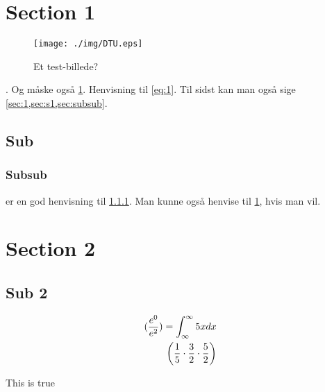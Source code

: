 
\newcommand{\lang}{danish}
\newcommand{\titl}{Test Document 1}
\newcommand{\auth}{Daniel Brasholt s214676}
\newcommand{\courseno}{01010}
\newcommand{\course}{Testkursus}
\newcommand{\dato}{Maj 2023}
\newcommand{\secheader}{Opgave}
\newcommand{\subsecheader}{Opg.}
\newcommand{\sourcefile}{}


\section{Section 1}
\label{sec:1}

\begin{figure}[H]
	\centering
	\texttt{[image: ./img/DTU.eps]}
	\caption{Et test-billede?}
	\label{fig:dtu}
\end{figure}

. Og måske også \cref{fig:dtu}. Henvisning til \cref{eq:1}. Til
sidst kan man også sige \cref{sec:1,sec:s1,sec:subsub}.

\subsection{Sub}
\label{sec:s1}

\subsubsection{Subsub}
\label{sec:subsub}

 er en god henvisning til \cref{sec:subsub}. Man kunne også
henvise til \cref{sec:1}, hvis man vil. 

\section{Section 2}

\subsection{Sub 2}

\begin{align}
\label{eq:1}
	(\frac{e^{0}}{e^{2}}) = \int_{\infty}^{\infty}{5xdx} \\
	\paren*{\frac{1}{5} \cdot \frac{3}{2} \cdot \frac{5}{2}}
\end{align}

This is true

\lipsum[1-15]


